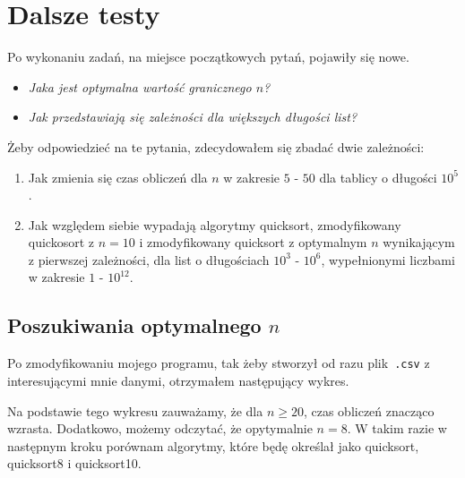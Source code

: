 \documentclass[12pt,a4paper]{article}
\begin{document}
\section{Dalsze testy}
Po wykonaniu zadań, na miejsce początkowych pytań, pojawiły się nowe.
\begin{itemize}
\item \textit{Jaka jest optymalna wartość granicznego $n$?}
\item \textit{Jak przedstawiają się zależności dla większych długości list?}
\end{itemize}
Żeby odpowiedzieć na te pytania, zdecydowałem się zbadać dwie zależności:
\begin{enumerate}
\item Jak zmienia się czas obliczeń dla $n$ w zakresie $5$ - $50$ dla tablicy o długości $10^5$.
\item Jak względem siebie wypadają algorytmy quicksort, zmodyfikowany quickosort z $n = 10$ i zmodyfikowany quicksort z optymalnym $n$ wynikającym z pierwszej zależności, dla list o długościach $10^3$ - $10^6$, wypełnionymi liczbami w zakresie $1$ - $10^{12}$.
\end{enumerate}
\newpage
\subsection*{Poszukiwania optymalnego $n$}
Po zmodyfikowaniu mojego programu, tak żeby stworzył od razu plik~\verb|.csv| z interesującymi mnie danymi, otrzymałem następujący wykres.
\begin{figure}[h!]
  \begin{center}
  \end{center}
\end{figure}
Na podstawie tego wykresu zauważamy, że dla $n\geq20$, czas obliczeń znacząco wzrasta. Dodatkowo, możemy odczytać, że opytymalnie $n = 8$. W takim razie w następnym kroku porównam algorytmy, które będę określał jako quicksort, quicksort8 i quicksort10.
\newpage
\end{document}
